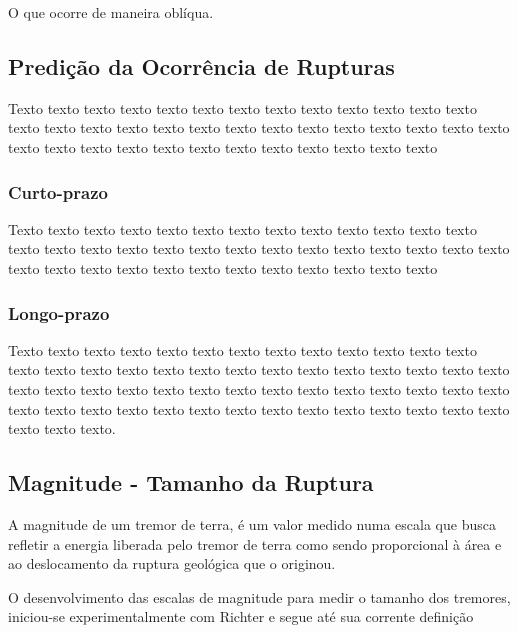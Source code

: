 O que ocorre de maneira oblíqua.



 
\subsection{Predição da Ocorrência de Rupturas}
\label{sec:fundamentos}

Texto texto texto texto texto texto texto texto texto texto texto texto texto
texto texto texto texto texto texto texto texto texto texto texto texto texto
texto texto texto texto texto texto texto texto texto texto texto texto texto


\subsubsection{Curto-prazo}
\label{sec:fundamentos}


Texto texto texto texto texto texto texto texto texto texto texto texto texto
texto texto texto texto texto texto texto texto texto texto texto texto texto
texto texto texto texto texto texto texto texto texto texto texto texto texto


\subsubsection{Longo-prazo}
\label{sec:fundamentos}

Texto texto texto texto texto texto texto texto texto texto texto texto texto
texto texto texto texto texto texto texto texto texto texto texto texto texto
texto texto texto texto texto texto texto texto texto texto texto texto texto
texto texto texto texto texto texto texto texto texto texto texto texto texto
texto texto texto texto texto texto.


 
\subsection{Magnitude - Tamanho da Ruptura}
\label{sec:risco_sismico}

A magnitude de um tremor de terra, é um valor medido numa escala que busca
refletir a energia liberada pelo tremor de terra como sendo proporcional à área
e ao deslocamento da ruptura geológica que o originou.

O desenvolvimento das escalas de magnitude para medir o tamanho dos tremores,
iniciou-se experimentalmente com Richter e segue até sua corrente definição



